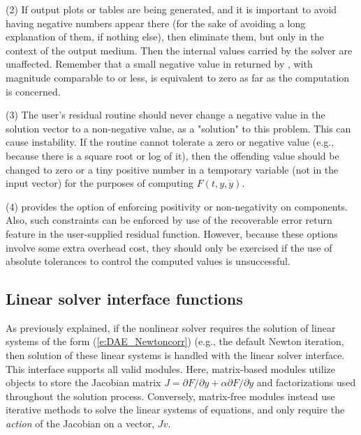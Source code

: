 (2) If output plots or tables are being generated, and it is important
to avoid having negative numbers appear there (for the sake of avoiding
a long explanation of them, if nothing else), then eliminate them, but
only in the context of the output medium.  Then the internal values carried
by the solver are unaffected.  Remember that a small negative value in 
returned by {\idas}, with magnitude comparable to  or less,
is equivalent to zero as far as the computation is concerned.

(3) The user's residual routine  should never change a
negative value in the solution vector  to a non-negative value,
as a "solution" to this problem.  This can cause instability.  If the
 routine cannot tolerate a zero or negative value (e.g., because
there is a square root or log of it), then the offending value should
be changed to zero or a tiny positive number in a temporary variable
(not in the input  vector) for the purposes of computing $F(t,y,\dot{y})$.

(4) {\idas} provides the option of enforcing positivity or non-negativity
on components.  Also, such constraints can be enforced by use of the
recoverable error return feature in the user-supplied residual function.
However, because these options involve some extra overhead cost, they
should only be exercised if the use of absolute tolerances to control
the computed values is unsuccessful.
\subsection{Linear solver interface functions}\label{sss:lin_solv_init}

As previously explained, if the nonlinear solver requires the solution of
linear systems of the form (\ref{e:DAE_Newtoncorr}) (e.g., the default Newton
iteration, then solution of these linear systems is handled with the
{\idals} linear solver interface.  This interface supports all valid
{\sunlinsol} modules.  Here, matrix-based {\sunlinsol} modules utilize
{\sunmatrix} objects to store the Jacobian matrix
$J = \partial{F}/\partial{y} + \alpha \partial{F}/\partial{\dot{y}}$
and factorizations used throughout the solution process.  Conversely,
matrix-free {\sunlinsol} modules instead use iterative methods to
solve the linear systems of equations, and only require the
\emph{action} of the Jacobian on a vector, $Jv$.

